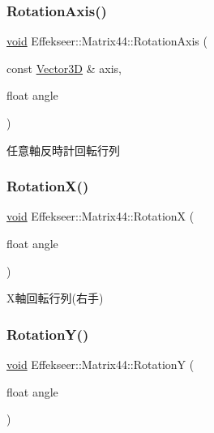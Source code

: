 \mbox{\label{struct_effekseer_1_1_matrix44_a3700f1ee3139f82d2763b5acd8a2cf6f}} 
\subsubsection{\texorpdfstring{Rotation\+Axis()}{RotationAxis()}}
{\footnotesize\ttfamily \mbox{\hyperlink{namespace_effekseer_ab34c4088e512200cf4c2716f168deb56}{void}} Effekseer\+::\+Matrix44\+::\+Rotation\+Axis (\begin{DoxyParamCaption}\item[{const \mbox{\hyperlink{struct_effekseer_1_1_vector3_d}{Vector3D}} \&}]{axis,  }\item[{float}]{angle }\end{DoxyParamCaption})}



任意軸反時計回転行列 

\mbox{\label{struct_effekseer_1_1_matrix44_a79af751b490a7107a767d85f87d9faf7}} 
\subsubsection{\texorpdfstring{Rotation\+X()}{RotationX()}}
{\footnotesize\ttfamily \mbox{\hyperlink{namespace_effekseer_ab34c4088e512200cf4c2716f168deb56}{void}} Effekseer\+::\+Matrix44\+::\+RotationX (\begin{DoxyParamCaption}\item[{float}]{angle }\end{DoxyParamCaption})}



X軸回転行列(右手) 

\mbox{\label{struct_effekseer_1_1_matrix44_a0c8f82d6551b691579d53278164806da}} 
\subsubsection{\texorpdfstring{Rotation\+Y()}{RotationY()}}
{\footnotesize\ttfamily \mbox{\hyperlink{namespace_effekseer_ab34c4088e512200cf4c2716f168deb56}{void}} Effekseer\+::\+Matrix44\+::\+RotationY (\begin{DoxyParamCaption}\item[{float}]{angle }\end{DoxyParamCaption})}



